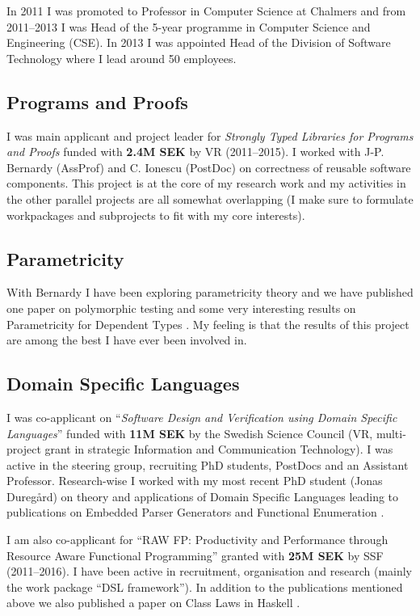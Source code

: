 In 2011 I was promoted to Professor in Computer Science at Chalmers
and from 2011--2013 I was Head of the 5-year programme in Computer
Science and Engineering (CSE).
%
In 2013 I was appointed Head of the Division of Software Technology
where I lead around 50 employees.

\subsection{Programs and Proofs}

I was main applicant and project leader for \emph{Strongly Typed
  Libraries for Programs and Proofs} funded with \textbf{2.4M SEK} by
VR (2011--2015).
%
I worked with J-P. Bernardy (AssProf) and C. Ionescu (PostDoc) on
correctness of reusable software components.
%
This project is at the core of my research work and my activities in the
other parallel projects are all somewhat overlapping (I make sure to
formulate workpackages and subprojects to fit with my core interests).

\subsection{Parametricity}
With Bernardy I have been exploring parametricity theory and we have
published one paper on polymorphic testing
\citep{bernardy_testing_2010} and some very interesting results on
Parametricity for Dependent Types \citep{bernardy_parametricity_2010,
  bernardy_proofs_2012}.
%
My feeling is that the results of this project are among the best I
have ever been involved in.

\subsection{Domain Specific Languages}

I was co-applicant on ``\emph{Software Design and Verification using
  Domain Specific Languages}'' funded with \textbf{11M SEK} by the
Swedish Science Council (VR, multi-project grant in strategic
Information and Communication Technology).
%
I was active in the steering group, recruiting PhD students, PostDocs
and an Assistant Professor.
%
Research-wise I worked with my most recent PhD student (Jonas
Duregård) on theory and applications of Domain Specific Languages
leading to publications on Embedded Parser Generators
\citep{BNFC-meta-Haskell2011} and Functional Enumeration
\citep{duregardHaskell12Feat}.

I am also co-applicant for ``RAW FP: Productivity and Performance
through Resource Aware Functional Programming'' granted with \textbf{25M SEK}
by SSF (2011--2016).
%
I have been active in recruitment, organisation and research (mainly
the work package ``DSL framework'').
%
In addition to the publications mentioned above we also published a
paper on Class Laws in Haskell \citep{jeuringHaskell12ClassLaws}.

